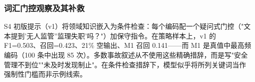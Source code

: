 \documentclass[11pt]{article}
\begin{document}
\subsubsection{{\cjkfont 词\allowbreak 汇\allowbreak 门\allowbreak 控\allowbreak 观\allowbreak 察\allowbreak 及\allowbreak 其\allowbreak 补\allowbreak 救}}
S4 {\cjkfont 初\allowbreak 版\allowbreak 提\allowbreak 示\allowbreak （}v1{\cjkfont ）\allowbreak 将\allowbreak 领\allowbreak 域\allowbreak 知\allowbreak 识\allowbreak 嵌\allowbreak 入\allowbreak 为\allowbreak 条\allowbreak 件\allowbreak 检\allowbreak 查\allowbreak ：\allowbreak 每\allowbreak 个\allowbreak 编\allowbreak 码\allowbreak 配\allowbreak 一\allowbreak 个\allowbreak 疑\allowbreak 问\allowbreak 式\allowbreak 门\allowbreak 控\allowbreak （}"{\cjkfont 文\allowbreak 本\allowbreak 提\allowbreak 到}'{\cjkfont 无\allowbreak 人\allowbreak 监\allowbreak 管}''{\cjkfont 监\allowbreak 理\allowbreak 失\allowbreak 职}'{\cjkfont 吗\allowbreak ？}"{\cjkfont ）\allowbreak 加\allowbreak 保\allowbreak 守\allowbreak 指\allowbreak 令\allowbreak 。\allowbreak 在\allowbreak 策\allowbreak 略\allowbreak 样\allowbreak 本\allowbreak 上\allowbreak ，}v1 {\cjkfont 的} F1=0.503{\cjkfont 、\allowbreak 召\allowbreak 回}=0.423{\cjkfont 、}21\% {\cjkfont 空\allowbreak 输\allowbreak 出\allowbreak 、}M1 {\cjkfont 召\allowbreak 回} 0.141------{\cjkfont 而} M1 {\cjkfont 是\allowbreak 真\allowbreak 值\allowbreak 中\allowbreak 最\allowbreak 高\allowbreak 频\allowbreak 编\allowbreak 码\allowbreak （}100 {\cjkfont 条\allowbreak 中\allowbreak 出\allowbreak 现} 85 {\cjkfont 次\allowbreak ）\allowbreak 。\allowbreak 多\allowbreak 数\allowbreak 事\allowbreak 故\allowbreak 叙\allowbreak 述\allowbreak 从\allowbreak 不\allowbreak 使\allowbreak 用\allowbreak 这\allowbreak 些\allowbreak 精\allowbreak 确\allowbreak 措\allowbreak 辞\allowbreak ，\allowbreak 而\allowbreak 是\allowbreak 写}"{\cjkfont 安\allowbreak 全\allowbreak 管\allowbreak 理\allowbreak 不\allowbreak 到\allowbreak 位}""{\cjkfont 未\allowbreak 及\allowbreak 时\allowbreak 发\allowbreak 现\allowbreak 制\allowbreak 止}"{\cjkfont 。\allowbreak 在\allowbreak 条\allowbreak 件\allowbreak 检\allowbreak 查\allowbreak 措\allowbreak 辞\allowbreak 下\allowbreak ，\allowbreak 模\allowbreak 型\allowbreak 似\allowbreak 乎\allowbreak 将\allowbreak 所\allowbreak 列\allowbreak 关\allowbreak 键\allowbreak 词\allowbreak 当\allowbreak 作\allowbreak 强\allowbreak 制\allowbreak 性\allowbreak 门\allowbreak 槛\allowbreak 而\allowbreak 非\allowbreak 示\allowbreak 例\allowbreak 线\allowbreak 索\allowbreak 。}
\end{document}
